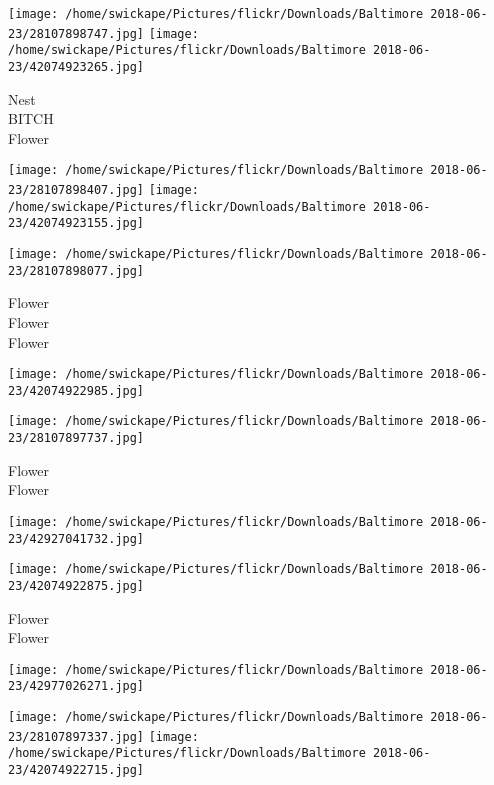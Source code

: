 \documentclass[10pt,letterpaper]{article}
\begin{document}
\vspace{0.25in}
\texttt{[image: /home/swickape/Pictures/flickr/Downloads/Baltimore 2018-06-23/28107898747.jpg]}
\texttt{[image: /home/swickape/Pictures/flickr/Downloads/Baltimore 2018-06-23/42074923265.jpg]}

Nest\\
BITCH\\
Flower\\
\pagebreak

\texttt{[image: /home/swickape/Pictures/flickr/Downloads/Baltimore 2018-06-23/28107898407.jpg]}
\texttt{[image: /home/swickape/Pictures/flickr/Downloads/Baltimore 2018-06-23/42074923155.jpg]}

\texttt{[image: /home/swickape/Pictures/flickr/Downloads/Baltimore 2018-06-23/28107898077.jpg]}

Flower\\
Flower\\
Flower\\
\pagebreak

\texttt{[image: /home/swickape/Pictures/flickr/Downloads/Baltimore 2018-06-23/42074922985.jpg]}

\vspace{0.25in}
\texttt{[image: /home/swickape/Pictures/flickr/Downloads/Baltimore 2018-06-23/28107897737.jpg]}

Flower\\
Flower\\
\pagebreak

\texttt{[image: /home/swickape/Pictures/flickr/Downloads/Baltimore 2018-06-23/42927041732.jpg]}

\vspace{0.25in}
\texttt{[image: /home/swickape/Pictures/flickr/Downloads/Baltimore 2018-06-23/42074922875.jpg]}

Flower\\
Flower\\
\pagebreak

\texttt{[image: /home/swickape/Pictures/flickr/Downloads/Baltimore 2018-06-23/42977026271.jpg]}

\vspace{0.25in}
\texttt{[image: /home/swickape/Pictures/flickr/Downloads/Baltimore 2018-06-23/28107897337.jpg]}
\texttt{[image: /home/swickape/Pictures/flickr/Downloads/Baltimore 2018-06-23/42074922715.jpg]}
\end{document}
